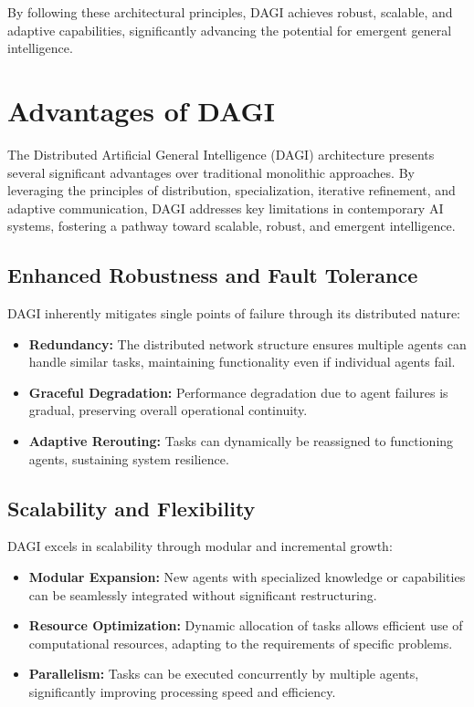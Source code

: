 \documentclass[12pt]{amsart}
\begin{document}
By following these architectural principles, DAGI achieves robust, scalable, and adaptive capabilities, significantly advancing the potential for emergent general intelligence.


\section{Advantages of DAGI}

The Distributed Artificial General Intelligence (DAGI) architecture presents several significant advantages over traditional monolithic approaches. By leveraging the principles of distribution, specialization, iterative refinement, and adaptive communication, DAGI addresses key limitations in contemporary AI systems, fostering a pathway toward scalable, robust, and emergent intelligence.

\subsection{Enhanced Robustness and Fault Tolerance}

DAGI inherently mitigates single points of failure through its distributed nature:

\begin{itemize}
    \item \textbf{Redundancy:} The distributed network structure ensures multiple agents can handle similar tasks, maintaining functionality even if individual agents fail.
    \item \textbf{Graceful Degradation:} Performance degradation due to agent failures is gradual, preserving overall operational continuity.
    \item \textbf{Adaptive Rerouting:} Tasks can dynamically be reassigned to functioning agents, sustaining system resilience.
\end{itemize}

\subsection{Scalability and Flexibility}

DAGI excels in scalability through modular and incremental growth:

\begin{itemize}
    \item \textbf{Modular Expansion:} New agents with specialized knowledge or capabilities can be seamlessly integrated without significant restructuring.
    \item \textbf{Resource Optimization:} Dynamic allocation of tasks allows efficient use of computational resources, adapting to the requirements of specific problems.
    \item \textbf{Parallelism:} Tasks can be executed concurrently by multiple agents, significantly improving processing speed and efficiency.
\end{itemize}
\end{document}
